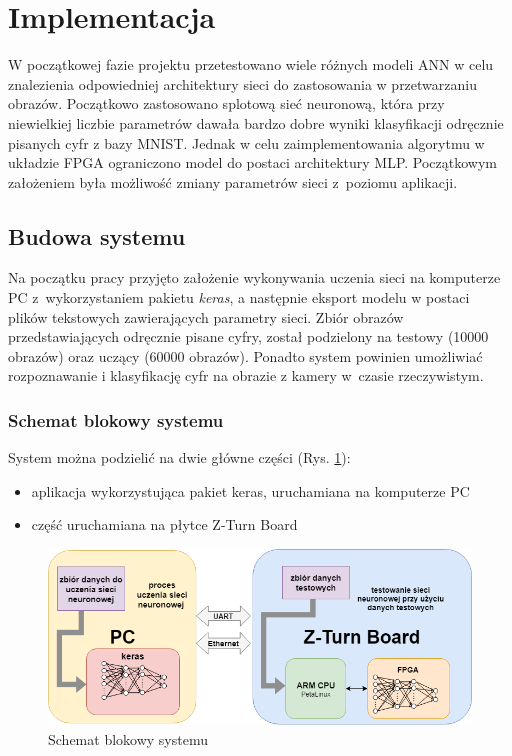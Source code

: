 \newpage %
\cleardoublepage %
\pagestyle{headings}

\section{Implementacja}
W początkowej fazie projektu przetestowano wiele różnych modeli ANN w celu znalezienia odpowiedniej architektury sieci do zastosowania w przetwarzaniu obrazów. Początkowo zastosowano splotową sieć neuronową, która przy niewielkiej liczbie parametrów dawała bardzo dobre wyniki klasyfikacji odręcznie pisanych cyfr z bazy MNIST. Jednak w celu zaimplementowania algorytmu w układzie FPGA ograniczono model do postaci architektury MLP. Początkowym założeniem była możliwość zmiany parametrów sieci z~poziomu aplikacji.

\subsection{Budowa systemu}

Na początku pracy przyjęto założenie wykonywania uczenia sieci na komputerze PC z~wykorzystaniem pakietu \emph{keras}, a następnie eksport modelu w postaci plików tekstowych zawierających parametry sieci. Zbiór obrazów przedstawiających odręcznie pisane cyfry, został podzielony na testowy (10000 obrazów) oraz uczący (60000 obrazów). Ponadto system powinien umożliwiać rozpoznawanie i klasyfikację cyfr na obrazie z kamery w~czasie rzeczywistym.

\subsubsection{Schemat blokowy systemu}

System można podzielić na dwie główne części (Rys. \ref{schemat_blokowy}):
\begin{itemize}
  \item aplikacja wykorzystująca pakiet keras, uruchamiana na komputerze PC
  \item część uruchamiana na płytce Z-Turn Board
\end{itemize}

\begin{figure}[!h]
  \centering
  \includegraphics[width=\textwidth]{img/schemat_blokowy.png}
  \caption{Schemat blokowy systemu}
  \label{schemat_blokowy}
\end{figure}

